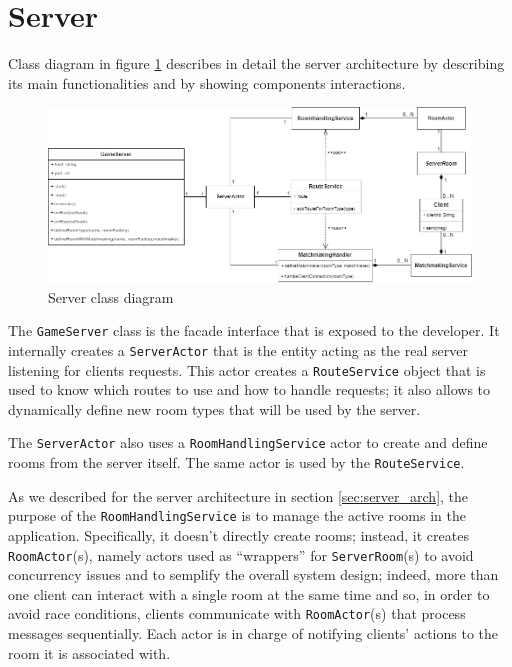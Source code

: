 \section{Server}
Class diagram in figure \ref{fig:server_class_diagram} describes in detail the server architecture by describing its main functionalities and by showing components interactions. 
\begin{figure}[h]
	\hspace*{-1.1in}
	\includegraphics[scale=0.55]{images/4-design/server_class.png}
	\caption{Server class diagram}
	\label{fig:server_class_diagram}
\end{figure}

The \texttt{GameServer} class is the facade interface that is exposed to the developer. It internally creates a \texttt{ServerActor} that is the entity acting as the real server listening for clients requests. This actor creates a \texttt{RouteService} object that is used to know which routes to use and how to handle requests; it also allows to dynamically define new room types that will be used by the server. 

The \texttt{ServerActor} also uses a \texttt{RoomHandlingService} actor to create and define rooms from the server itself. The same actor is used by the \texttt{RouteService}.

As we described for the server architecture in section \ref{sec:server_arch}, the purpose of the \texttt{RoomHandlingService} is to manage the active rooms in the application. Specifically, it doesn't directly create rooms; instead, it creates \texttt{RoomActor}(s), namely actors used as ``wrappers'' for \texttt{ServerRoom}(s) to avoid concurrency issues and to semplify the overall system design; indeed, more than one client can interact with a single room at the same time and so, in order to avoid race conditions, clients communicate with \texttt{RoomActor}(s) that process messages sequentially. Each actor is in charge of notifying clients' actions to the room it is associated with.

